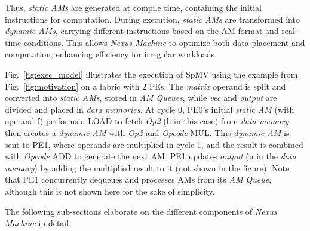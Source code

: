 \begin{comment}
{\color{blue}Thus, \textit{static AMs} are generated at compile-time based on initial data placement and are responsible for initiating computation, while \textit{dynamic AMs} are created on-the-fly, adapting to real-time data conditions and resource availability. This enables Nexus Machine to optimize both data placement and computation, enhancing overall efficiency for irregular workloads.}
\end{comment}
Thus, \textit{static AMs} are generated at compile time, containing the initial instructions for computation. During execution, \textit{static AMs} are transformed into \textit{dynamic AMs}, carrying different instructions based on the AM format and real-time conditions. This allows \textit{Nexus Machine} to optimize both data placement and computation, enhancing efficiency for irregular workloads.

Fig.~\ref{fig:exec_model} illustrates the execution of SpMV using the example from Fig.~\ref{fig:motivation} on a fabric with 2 PEs. The \textit{matrix} operand is split and converted into \textit{static AMs}, stored in \textit{AM Queues}, while \textit{vec} and \textit{output} are divided and placed in \textit{data memories}. At cycle 0, PE0’s initial \textit{static AM} (with operand f) performs a LOAD to fetch \textit{Op2} (h in this case) from \textit{data memory}, then creates a \textit{dynamic AM} with \textit{Op2} and \textit{Opcode} MUL. This \textit{dynamic AM} is sent to PE1, where operands are multiplied in cycle 1, and the result is combined with \textit{Opcode} ADD to generate the next AM. PE1 updates \textit{output} (n in the \textit{data memory}) by adding the multiplied result to it (not shown in the figure).
Note that PE1 concurrently dequeues and processes AMs from its \textit{AM Queue}, although this is not shown here for the sake of simplicity.

The following sub-sections elaborate on the different components of \textit{Nexus Machine} in detail.

